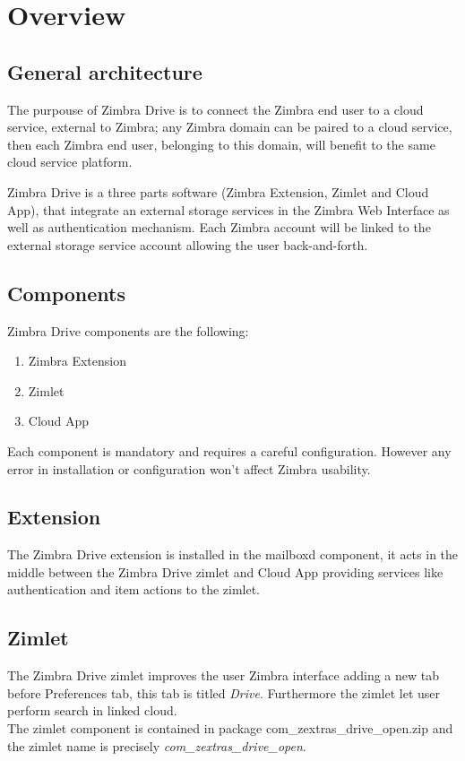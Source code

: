 \section{Overview}
\subsection{General architecture}\label{==subsec:general_architecture==}
    The purpouse of Zimbra Drive is to connect the Zimbra end user to a cloud service, external to Zimbra;
    any Zimbra domain can be paired to a cloud service, then each Zimbra end user, belonging to this domain,
    will benefit to the same cloud service platform.

    Zimbra Drive is a three parts software (Zimbra Extension, Zimlet and Cloud App),
    that integrate an external storage services in the Zimbra Web Interface as well as authentication mechanism.
    Each Zimbra account will be linked to the external storage service account allowing the user back-and-forth.
%

\subsection{Components}
    Zimbra Drive components are the following:
    \begin{enumerate}
        \item Zimbra Extension
        \item Zimlet
        \item Cloud App
    \end{enumerate}
\begin{comment}
WARNING:
\end{comment}
    \begin{warning}
        Each component is mandatory and requires a careful configuration.
        However any error in installation or configuration won't affect Zimbra usability.
    \end{warning}

        \subsection{Extension}
        The Zimbra Drive extension is installed in the mailboxd component, it acts in the middle between the Zimbra
        Drive zimlet and Cloud App providing services like authentication and item actions to the zimlet.

        \subsection{Zimlet}
        The Zimbra Drive zimlet improves the user Zimbra interface adding a new tab before Preferences tab,
        this tab is titled \textit{Drive}. Furthermore the zimlet let user perform search in linked cloud.\\
        The zimlet component is contained in package com\_zextras\_drive\_open.zip and the zimlet name is precisely
        \textit{com\_zextras\_drive\_open}.

